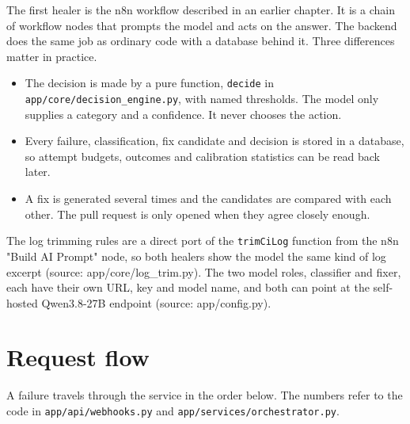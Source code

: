 \documentclass[11pt,a4paper]{report}
\begin{document}
The first healer is the n8n workflow described in an earlier chapter. It is a chain of workflow nodes that prompts the model and acts on the answer. The backend does the same job as ordinary code with a database behind it. Three differences matter in practice.

\begin{itemize}[leftmargin=*,itemsep=2pt]
\item The decision is made by a pure function, \texttt{decide} in \texttt{app/\allowbreak{}core/\allowbreak{}decision\_\allowbreak{}engine.\allowbreak{}py}, with named thresholds. The model only supplies a category and a confidence. It never chooses the action.
\item Every failure, classification, fix candidate and decision is stored in a database, so attempt budgets, outcomes and calibration statistics can be read back later.
\item A fix is generated several times and the candidates are compared with each other. The pull request is only opened when they agree closely enough.
\end{itemize}

The log trimming rules are a direct port of the \texttt{trimCiLog} function from the n8n "Build AI Prompt" node, so both healers show the model the same kind of log excerpt (source: app/core/log\_trim.py). The two model roles, classifier and fixer, each have their own URL, key and model name, and both can point at the self-hosted Qwen3.8-27B endpoint (source: app/config.py).

\section{Request flow}

A failure travels through the service in the order below. The numbers refer to the code in \texttt{app/\allowbreak{}api/\allowbreak{}webhooks.\allowbreak{}py} and \texttt{app/\allowbreak{}services/\allowbreak{}orchestrator.\allowbreak{}py}.
\end{document}
